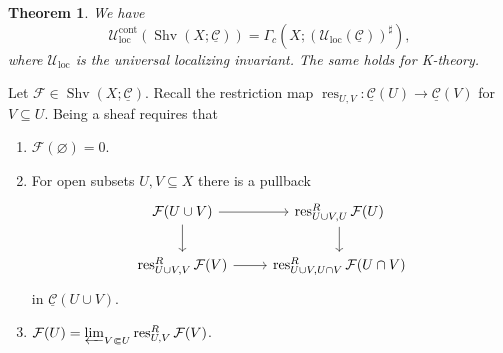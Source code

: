 \documentclass[draft]{amsart}
\newcommand{\ul}[1]{\underline{#1}}
\newcommand{\cat}[1]{\mathcal{#1}}
\newcommand{\sheaf}[1]{\mathcal{#1}}
\renewcommand{\emptyset}{\varnothing}
\DeclareMathOperator{\Shv}{Shv}
\DeclareMathOperator{\res}{res}
\newtheorem{thm}{Theorem}[section]
\theoremstyle{definition}
\begin{document}
\begin{thm}
We have
\[
{\cat U}^{\mathrm{cont}}_{\mathrm{loc}}(\Shv(X; \ul{\cat C})) = \Gamma_c(X; ({\cat U}_{\mathrm{loc}}(\ul{\cat C}))^{\sharp}),
\]
where $\cat U_{\mathrm{loc}}$ is the universal localizing invariant.
The same holds for K-theory.
\end{thm}

Let $\sheaf F \in \Shv(X;\ul{\cat C})$. Recall the restriction map $\res_{U,V}\colon \ul{\cat C}(U) \to \ul{\cat C}(V)$ for $V\subseteq U$. Being a sheaf requires that
\begin{enumerate}[(1)]
\item $\sheaf F(\emptyset) = 0$.
\item For open subsets $U, V \subseteq X$ there is a pullback
\[
\begin{tikzcd}
\sheaf F(U\cup V) \ar[d] \ar[r] & \res^R_{U\cup V,U}\sheaf F(U) \ar[d] \\
\res^R_{U\cup V,V}\sheaf F(V) \ar[r] & \res^R_{U\cup V,U\cap V} \sheaf F(U\cap V)
\end{tikzcd}
\]
in $\ul{\cat C}(U\cup V)$.

\item\label{Efimov:sheaf-3} $\sheaf F(U) = \varprojlim_{V\Subset U} \res^R_{U,V}\sheaf F(V)$.
\end{enumerate}
\end{document}
